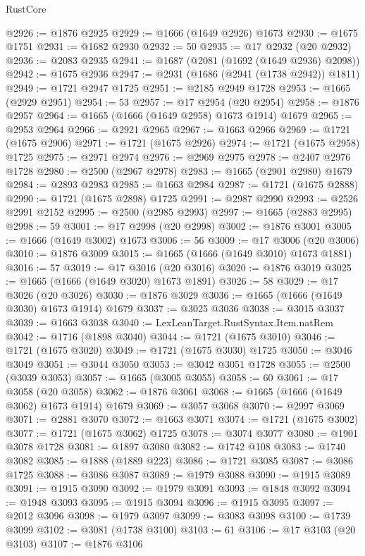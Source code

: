 \begin{lexlean}{RustCore}
\begin{coremodule}
@2926 := @1876 @2925
@2929 := @1666 (@1649 @2926) @1673
@2930 := @1675 @1751
@2931 := @1682 @2930
@2932 := 50
@2935 := @17 @2932 (@20 @2932)
@2936 := @2083 @2935
@2941 := @1687 (@2081 (@1692 (@1649 @2936) @2098))
@2942 := @1675 @2936
@2947 := @2931 (@1686 (@2941 (@1738 @2942)) @1811)
@2949 := @1721 @2947 @1725
@2951 := @2185 @2949 @1728
@2953 := @1665 (@2929 @2951)
@2954 := 53
@2957 := @17 @2954 (@20 @2954)
@2958 := @1876 @2957
@2964 := @1665 (@1666 (@1649 @2958) @1673 @1914) @1679
@2965 := @2953 @2964
@2966 := @2921 @2965
@2967 := @1663 @2966
@2969 := @1721 (@1675 @2906)
@2971 := @1721 (@1675 @2926)
@2974 := @1721 (@1675 @2958) @1725
@2975 := @2971 @2974
@2976 := @2969 @2975
@2978 := @2407 @2976 @1728
@2980 := @2500 (@2967 @2978)
@2983 := @1665 (@2901 @2980) @1679
@2984 := @2893 @2983
@2985 := @1663 @2984
@2987 := @1721 (@1675 @2888)
@2990 := @1721 (@1675 @2898) @1725
@2991 := @2987 @2990
@2993 := @2526 @2991 @2152
@2995 := @2500 (@2985 @2993)
@2997 := @1665 (@2883 @2995)
@2998 := 59
@3001 := @17 @2998 (@20 @2998)
@3002 := @1876 @3001
@3005 := @1666 (@1649 @3002) @1673
@3006 := 56
@3009 := @17 @3006 (@20 @3006)
@3010 := @1876 @3009
@3015 := @1665 (@1666 (@1649 @3010) @1673 @1881)
@3016 := 57
@3019 := @17 @3016 (@20 @3016)
@3020 := @1876 @3019
@3025 := @1665 (@1666 (@1649 @3020) @1673 @1891)
@3026 := 58
@3029 := @17 @3026 (@20 @3026)
@3030 := @1876 @3029
@3036 := @1665 (@1666 (@1649 @3030) @1673 @1914) @1679
@3037 := @3025 @3036
@3038 := @3015 @3037
@3039 := @1663 @3038
@3040 := LexLeanTarget.RustSyntax.Item.natRem
@3042 := @1716 (@1898 @3040)
@3044 := @1721 (@1675 @3010)
@3046 := @1721 (@1675 @3020)
@3049 := @1721 (@1675 @3030) @1725
@3050 := @3046 @3049
@3051 := @3044 @3050
@3053 := @3042 @3051 @1728
@3055 := @2500 (@3039 @3053)
@3057 := @1665 (@3005 @3055)
@3058 := 60
@3061 := @17 @3058 (@20 @3058)
@3062 := @1876 @3061
@3068 := @1665 (@1666 (@1649 @3062) @1673 @1914) @1679
@3069 := @3057 @3068
@3070 := @2997 @3069
@3071 := @2881 @3070
@3072 := @1663 @3071
@3074 := @1721 (@1675 @3002)
@3077 := @1721 (@1675 @3062) @1725
@3078 := @3074 @3077
@3080 := @1901 @3078 @1728
@3081 := @1897 @3080
@3082 := @1742 @108
@3083 := @1740 @3082
@3085 := @1888 (@1889 @223)
@3086 := @1721 @3085
@3087 := @3086 @1725
@3088 := @3086 @3087
@3089 := @1979 @3088
@3090 := @1915 @3089
@3091 := @1915 @3090
@3092 := @1979 @3091
@3093 := @1848 @3092
@3094 := @1948 @3093
@3095 := @1915 @3094
@3096 := @1915 @3095
@3097 := @2012 @3096
@3098 := @1979 @3097
@3099 := @3083 @3098
@3100 := @1739 @3099
@3102 := @3081 (@1738 @3100)
@3103 := 61
@3106 := @17 @3103 (@20 @3103)
@3107 := @1876 @3106

\end{coremodule}
\end{lexlean}
